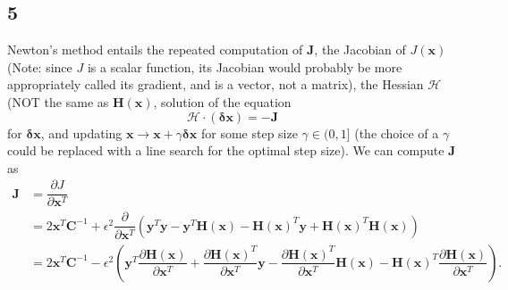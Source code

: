 \documentclass[11pt]{article}
\begin{document}
\subsection*{5}
Newton's method entails the repeated computation of $\mathbf{J}$, the Jacobian of $J(\mathbf{x})$ (Note: since $J$ is a scalar function, its Jacobian would probably be more appropriately called its gradient, and is a vector, not a matrix), the Hessian $\mathbf{\mathcal{H}}$ (NOT the same as $\mathbf{H(x)}$, solution of the equation
\[
 \mathbf{\mathcal{H}} \cdot (\mathbf{\delta x}) = -\mathbf{J} \tag{6}
 \]
for $\mathbf{\delta x}$, and updating $\mathbf{x}\to\mathbf{x} + \gamma\mathbf{\delta x}$ for some step size $\gamma\in (0,1] $ (the choice of a $\gamma$ could be replaced with a line search for the optimal step size). We can compute $\mathbf{J}$ as 
\[
\begin{aligned}
\mathbf{J} &= \dfrac{\partial J}{\partial\mathbf{x}^T}\\
&= 2\mathbf{x}^T\mathbf{C}^{-1} +  \epsilon^2 \dfrac{\partial}{\partial\mathbf{x}^T}\left(\mathbf{y}^T\mathbf{y} - \mathbf{y}^T\mathbf{H(x)} - \mathbf{H(x)}^T\mathbf{y} + \mathbf{H(x)}^T\mathbf{H(x)}\right)\\
&= 2\mathbf{x}^T\mathbf{C}^{-1} - \epsilon^2\left(\mathbf{y}^T\dfrac{\partial\mathbf{H(x)}}{\partial\mathbf{x}^T} + \dfrac{\partial\mathbf{H(x)}^T}{\partial\mathbf{x}^T}\mathbf{y} - \dfrac{\partial\mathbf{H(x)}^T}{\partial\mathbf{x}^T}\mathbf{H(x)} - \mathbf{H(x)}^T\dfrac{\partial\mathbf{H(x)}}{\partial\mathbf{x}^T}\right).
\end{aligned}
\]
\end{document}
